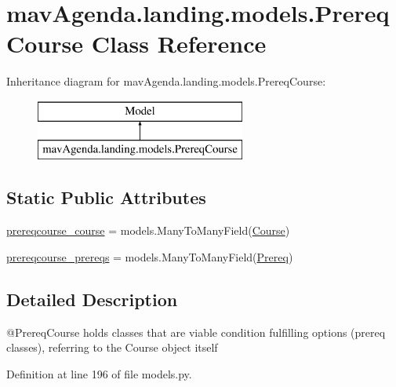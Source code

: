 \hypertarget{classmavAgenda_1_1landing_1_1models_1_1PrereqCourse}{}\section{mav\+Agenda.\+landing.\+models.\+Prereq\+Course Class Reference}
\label{classmavAgenda_1_1landing_1_1models_1_1PrereqCourse}
Inheritance diagram for mav\+Agenda.\+landing.\+models.\+Prereq\+Course\+:\begin{figure}[H]
\begin{center}
\leavevmode
\includegraphics[height=2.000000cm]{classmavAgenda_1_1landing_1_1models_1_1PrereqCourse}
\end{center}
\end{figure}
\subsection*{Static Public Attributes}
\begin{DoxyCompactItemize}
\item 
\mbox{\hyperlink{classmavAgenda_1_1landing_1_1models_1_1PrereqCourse_a9195ac7a561cb1f5242c56b89f5bca32}{prereqcourse\+\_\+course}} = models.\+Many\+To\+Many\+Field(\mbox{\hyperlink{classmavAgenda_1_1landing_1_1models_1_1Course}{Course}})
\item 
\mbox{\hyperlink{classmavAgenda_1_1landing_1_1models_1_1PrereqCourse_ab3117e84a7c5cf97103aaa55b48b1ab9}{prereqcourse\+\_\+prereqs}} = models.\+Many\+To\+Many\+Field(\mbox{\hyperlink{classmavAgenda_1_1landing_1_1models_1_1Prereq}{Prereq}})
\end{DoxyCompactItemize}


\subsection{Detailed Description}
\begin{DoxyVerb}@PrereqCourse  holds classes that are viable condition fulfilling options (prereq classes),
        referring to the Course object itself
\end{DoxyVerb}
 

Definition at line 196 of file models.\+py.




